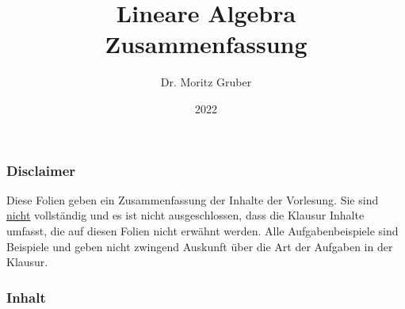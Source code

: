 

\title{Lineare Algebra\\[3mm] 
	\large Zusammenfassung
}
\author{Dr. Moritz Gruber} 
\date{2022}



%
\begin{frame}[plain] 
 \titlepage
\end{frame}
%
\begin{frame}\frametitle{Disclaimer}
Diese Folien geben ein Zusammenfassung der Inhalte der Vorlesung. Sie sind \underline{nicht} vollständig und es ist nicht ausgeschlossen, dass die Klausur Inhalte umfasst, die auf diesen Folien nicht erwähnt werden. Alle Aufgabenbeispiele sind Beispiele und geben nicht zwingend Auskunft über die Art der Aufgaben in der Klausur.
\end{frame}
%
\begin{frame}\frametitle{Inhalt}
   \tableofcontents
\end{frame}
%
